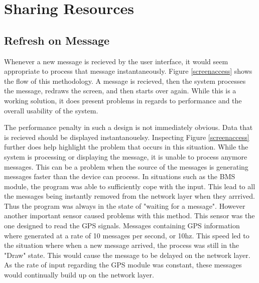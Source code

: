 

\section{Sharing Resources}

\subsection{Refresh on Message}

Whenever a new message is recieved by the user interface, it would seem appropriate to process that message instantaneously. Figure \ref{screenaccess} shows the flow of this methodology. A message is recieved, then the system processes the message, redraws the screen, and then starts over again. While this is a working solution, it does present problems in regards to performance and the overall usability of the system.

The performance penalty in such a design is not immediately obvious. Data that is recieved should be displayed instantanouelsy. Inspecting Figure \ref{screenaccess} further does help highlight the problem that occurs in this situation. While the system is processing or displaying the message, it is unable to process anymore messages. This can be a problem when the source of the messages is generating messages faster than the device can process.
In situations such as the BMS module, the program was able to sufficiently cope with the input. This lead to all the messages being instantly removed from the network layer when they arrrived. Thus the program was always in the state of "waiting for a message". However another important sensor caused problems with this method. This sensor was the one designed to read the GPS signals. Messages containing GPS information where generated at a rate of 10 messages per second, or 10hz. This speed led to the situation where when a new message arrived, the process was still in the "Draw" state. This would cause the message to be delayed on the network layer. As the rate of input regarding the GPS module was constant, these messages would continually build up on the network layer. 




